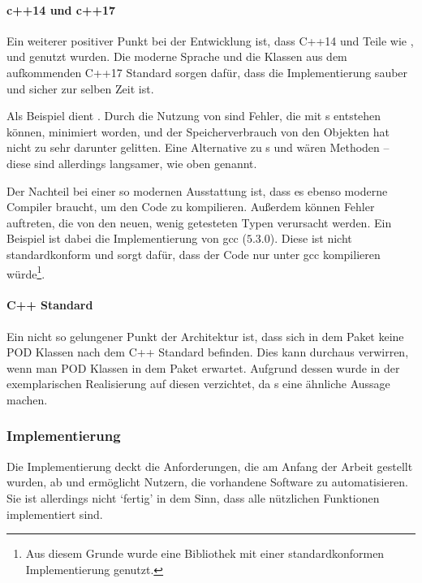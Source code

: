     \paragraph{c++14 und c++17}
      Ein weiterer positiver Punkt bei der Entwicklung ist, dass C++14 und Teile wie  \autocite{any-lib},  und  \autocite{variant-lib} genutzt wurden. Die moderne Sprache und die Klassen aus dem aufkommenden C++17 Standard sorgen dafür, dass die Implementierung sauber und sicher zur selben Zeit ist.

      Als Beispiel dient . Durch die Nutzung von  sind Fehler, die mit s entstehen können, minimiert worden, und der Speicherverbrauch von den Objekten hat nicht zu sehr darunter gelitten. Eine Alternative zu s und  wären  Methoden -- diese sind allerdings langsamer, wie oben genannt.

      Der Nachteil bei einer so modernen Ausstattung ist, dass es ebenso moderne Compiler braucht, um den Code zu kompilieren. Außerdem können Fehler auftreten, die von den neuen, wenig getesteten Typen verursacht werden. Ein Beispiel ist dabei die  Implementierung von gcc ($5.3.0$). Diese ist nicht standardkonform und sorgt dafür, dass der Code nur unter gcc kompilieren würde\footnote{
        Aus diesem Grunde wurde eine Bibliothek mit einer standardkonformen Implementierung genutzt.
      }.

    \paragraph{C++ Standard}
      Ein nicht so gelungener Punkt der Architektur ist, dass sich in dem  Paket keine POD Klassen nach dem C++ Standard befinden. Dies kann durchaus verwirren, wenn man POD Klassen in dem Paket erwartet. Aufgrund dessen wurde in der exemplarischen Realisierung auf diesen  verzichtet, da s eine ähnliche Aussage machen.

  \subsubsection{Implementierung}
  \label{sssec:Implementierung}
    Die Implementierung deckt die Anforderungen, die am Anfang der Arbeit gestellt wurden, ab und ermöglicht Nutzern, die vorhandene Software zu automatisieren. Sie ist allerdings nicht `fertig' in dem Sinn, dass alle nützlichen Funktionen implementiert sind.


